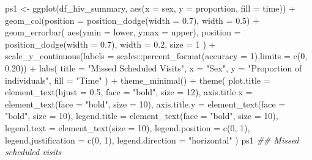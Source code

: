 \documentclass[
  letterpaper,
  DIV=11,
  numbers=noendperiod]{scrartcl}
\newenvironment{Shaded}{\begin{snugshade}}{\end{snugshade}}
\newcommand{\AttributeTok}[1]{\textcolor[rgb]{0.40,0.45,0.13}{#1}}
\newcommand{\DecValTok}[1]{\textcolor[rgb]{0.68,0.00,0.00}{#1}}
\newcommand{\DocumentationTok}[1]{\textcolor[rgb]{0.37,0.37,0.37}{\textit{#1}}}
\newcommand{\FloatTok}[1]{\textcolor[rgb]{0.68,0.00,0.00}{#1}}
\newcommand{\FunctionTok}[1]{\textcolor[rgb]{0.28,0.35,0.67}{#1}}
\newcommand{\NormalTok}[1]{\textcolor[rgb]{0.00,0.23,0.31}{#1}}
\newcommand{\OtherTok}[1]{\textcolor[rgb]{0.00,0.23,0.31}{#1}}
\newcommand{\SpecialCharTok}[1]{\textcolor[rgb]{0.37,0.37,0.37}{#1}}
\newcommand{\StringTok}[1]{\textcolor[rgb]{0.13,0.47,0.30}{#1}}
\begin{document}
\begin{Shaded}
\begin{Highlighting}[]
\NormalTok{ps1 }\OtherTok{\textless{}{-}} \FunctionTok{ggplot}\NormalTok{(df\_hiv\_summary, }\FunctionTok{aes}\NormalTok{(}\AttributeTok{x =}\NormalTok{ sex, }\AttributeTok{y =}\NormalTok{ proportion, }\AttributeTok{fill =}\NormalTok{ time)) }\SpecialCharTok{+}
  \FunctionTok{geom\_col}\NormalTok{(}\AttributeTok{position =} \FunctionTok{position\_dodge}\NormalTok{(}\AttributeTok{width =} \FloatTok{0.7}\NormalTok{), }\AttributeTok{width =} \FloatTok{0.5}\NormalTok{) }\SpecialCharTok{+}
  \FunctionTok{geom\_errorbar}\NormalTok{(}
    \FunctionTok{aes}\NormalTok{(}\AttributeTok{ymin =}\NormalTok{ lower, }\AttributeTok{ymax =}\NormalTok{ upper),}
    \AttributeTok{position =} \FunctionTok{position\_dodge}\NormalTok{(}\AttributeTok{width =} \FloatTok{0.7}\NormalTok{),}
    \AttributeTok{width =} \FloatTok{0.2}\NormalTok{,}
    \AttributeTok{size =} \DecValTok{1}
\NormalTok{  ) }\SpecialCharTok{+}
  \FunctionTok{scale\_y\_continuous}\NormalTok{(}\AttributeTok{labels =}\NormalTok{ scales}\SpecialCharTok{::}\FunctionTok{percent\_format}\NormalTok{(}\AttributeTok{accuracy =} \DecValTok{1}\NormalTok{),}\AttributeTok{limits =} \FunctionTok{c}\NormalTok{(}\DecValTok{0}\NormalTok{, }\FloatTok{0.20}\NormalTok{)) }\SpecialCharTok{+}
  \FunctionTok{labs}\NormalTok{(}
    \AttributeTok{title =} \StringTok{"Missed Scheduled Visits"}\NormalTok{,}
    \AttributeTok{x =} \StringTok{"Sex"}\NormalTok{,}
    \AttributeTok{y =} \StringTok{"Proportion of individuals"}\NormalTok{,}
    \AttributeTok{fill =} \StringTok{"Time"}
\NormalTok{  ) }\SpecialCharTok{+}
  \FunctionTok{theme\_minimal}\NormalTok{() }\SpecialCharTok{+}
  \FunctionTok{theme}\NormalTok{(}
    \AttributeTok{plot.title =} \FunctionTok{element\_text}\NormalTok{(}\AttributeTok{hjust =} \FloatTok{0.5}\NormalTok{, }\AttributeTok{face =} \StringTok{"bold"}\NormalTok{, }\AttributeTok{size =} \DecValTok{12}\NormalTok{),}
    \AttributeTok{axis.title.x =} \FunctionTok{element\_text}\NormalTok{(}\AttributeTok{face =} \StringTok{"bold"}\NormalTok{, }\AttributeTok{size =} \DecValTok{10}\NormalTok{),}
    \AttributeTok{axis.title.y =} \FunctionTok{element\_text}\NormalTok{(}\AttributeTok{face =} \StringTok{"bold"}\NormalTok{, }\AttributeTok{size =} \DecValTok{10}\NormalTok{),}
    \AttributeTok{legend.title =} \FunctionTok{element\_text}\NormalTok{(}\AttributeTok{face =} \StringTok{"bold"}\NormalTok{, }\AttributeTok{size =} \DecValTok{10}\NormalTok{),}
    \AttributeTok{legend.text =} \FunctionTok{element\_text}\NormalTok{(}\AttributeTok{size =} \DecValTok{10}\NormalTok{),}
    \AttributeTok{legend.position =} \FunctionTok{c}\NormalTok{(}\DecValTok{0}\NormalTok{, }\DecValTok{1}\NormalTok{),}
    \AttributeTok{legend.justification =} \FunctionTok{c}\NormalTok{(}\DecValTok{0}\NormalTok{, }\DecValTok{1}\NormalTok{),}
    \AttributeTok{legend.direction =} \StringTok{"horizontal"}
\NormalTok{  )}
\NormalTok{ps1 }\DocumentationTok{\#\# Missed scheduled visits}
\end{Highlighting}
\end{Shaded}
\end{document}
